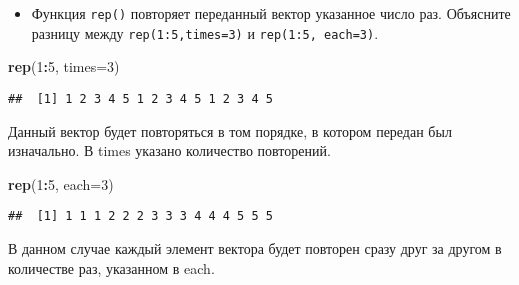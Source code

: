 \documentclass[]{article}
\newenvironment{Shaded}{\begin{snugshade}}{\end{snugshade}}
\newcommand{\KeywordTok}[1]{\textcolor[rgb]{0.13,0.29,0.53}{\textbf{#1}}}
\newcommand{\DataTypeTok}[1]{\textcolor[rgb]{0.13,0.29,0.53}{#1}}
\newcommand{\DecValTok}[1]{\textcolor[rgb]{0.00,0.00,0.81}{#1}}
\newcommand{\OperatorTok}[1]{\textcolor[rgb]{0.81,0.36,0.00}{\textbf{#1}}}
\newcommand{\NormalTok}[1]{#1}
\providecommand{\tightlist}{%
  \setlength{\itemsep}{0pt}\setlength{\parskip}{0pt}}
\begin{document}
\begin{itemize}
\tightlist
\item
  Функция \texttt{rep()} повторяет переданный вектор указанное число
  раз. Объясните разницу между \texttt{rep(1:5,times=3)} и
  \texttt{rep(1:5,\ each=3)}.
\end{itemize}

\begin{Shaded}
\begin{Highlighting}[]
\KeywordTok{rep}\NormalTok{(}\DecValTok{1}\OperatorTok{:}\DecValTok{5}\NormalTok{, }\DataTypeTok{times=}\DecValTok{3}\NormalTok{)}
\end{Highlighting}
\end{Shaded}

\begin{verbatim}
##  [1] 1 2 3 4 5 1 2 3 4 5 1 2 3 4 5
\end{verbatim}

Данный вектор будет повторяться в том порядке, в котором передан был
изначально. В times указано количество повторений.

\begin{Shaded}
\begin{Highlighting}[]
\KeywordTok{rep}\NormalTok{(}\DecValTok{1}\OperatorTok{:}\DecValTok{5}\NormalTok{, }\DataTypeTok{each=}\DecValTok{3}\NormalTok{)}
\end{Highlighting}
\end{Shaded}

\begin{verbatim}
##  [1] 1 1 1 2 2 2 3 3 3 4 4 4 5 5 5
\end{verbatim}

В данном случае каждый элемент вектора будет повторен сразу друг за
другом в количестве раз, указанном в each.
\end{document}
